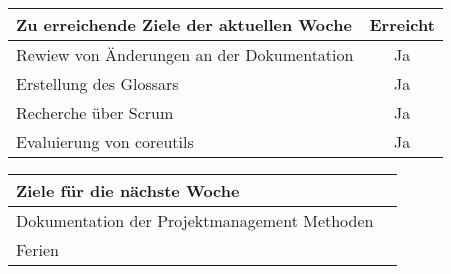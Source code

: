 \begin{tabularx}{\textwidth}{Xc}
    \arrayrulecolor{OliveGreen}
    \toprule
    {\bfseries Zu erreichende Ziele der aktuellen Woche} & {\bfseries Erreicht} \\
    \midrule[2pt]
    Rewiew von Änderungen an der Dokumentation           &Ja                    \\
    \rowcolor{OliveGreen!15}
    Erstellung des Glossars                              &Ja                    \\
    \rowcolor{White}
    Recherche über Scrum &Ja                    \\
    \rowcolor{OliveGreen!15}
    Evaluierung von coreutils                       &Ja                    \\
    \bottomrule[2pt]
\end{tabularx}
%
\vspace{1cm}
%
\begin{tabularx}{\textwidth}{Xc}
    \arrayrulecolor{OliveGreen}
    \toprule
    {\bfseries Ziele für die nächste Woche}              &                      \\
    \midrule[2pt]
    Dokumentation der Projektmanagement Methoden                            &                      \\
    \rowcolor{OliveGreen!15}
    Ferien                 &                      \\
\end{tabularx}
